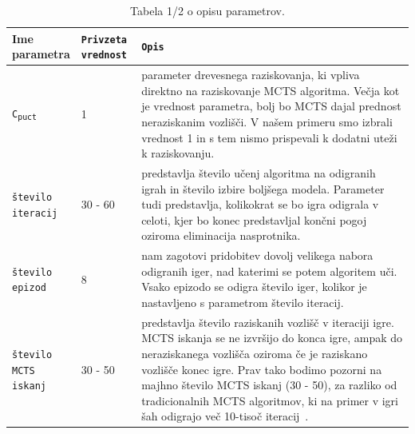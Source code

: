 \documentclass[a4paper, 12pt]{book}
\begin{document}
\begin{table}
	\begin{center}
		\begin{tabular}{p{0.15\linewidth}|p{0.15\linewidth}|p{0.7\linewidth}}
			Ime parametra                             & {\tt Privzeta vrednost} & {\tt Opis} \\ \hline
			{\tt C\textsubscript{puct}}               & 1 						& parameter drevesnega raziskovanja, ki vpliva direktno na raziskovanje MCTS algoritma. 
																				  Večja kot je vrednost parametra, bolj bo MCTS dajal prednost neraziskanim vozlišči. V našem primeru smo izbrali vrednost 1 in s tem nismo prispevali k dodatni uteži k raziskovanju.\\
			{\tt število iteracij}                    & 30 - 60					& predstavlja število učenj algoritma na odigranih igrah in število izbire boljšega modela.
																				  Parameter tudi predstavlja, kolikokrat se bo igra odigrala v celoti, kjer bo konec predstavljal končni pogoj oziroma eliminacija nasprotnika.\\
			{\tt število epizod}                      & 8 						& nam zagotovi pridobitev dovolj velikega nabora odigranih iger, nad katerimi se potem algoritem uči.
																				  Vsako epizodo se odigra število iger, kolikor je nastavljeno s parametrom število iteracij.\\
			{\tt število MCTS iskanj}                 & 30 - 50					& predstavlja število raziskanih vozlišč v iteraciji igre. 
														 						  MCTS iskanja se ne izvršijo do konca igre, ampak do neraziskanega vozlišča oziroma če je raziskano vozlišče konec igre.
														 						  Prav tako bodimo pozorni na majhno število MCTS iskanj (30 - 50), za razliko od tradicionalnih MCTS algoritmov, ki na primer v igri šah odigrajo več 10-tisoč iteracij~\cite{kohne}.\\
		
		\end{tabular}
	\end{center}
	\caption{Tabela 1/2 o opisu parametrov.}
	\label{tableParameters1}
\end{table}
\end{document}
